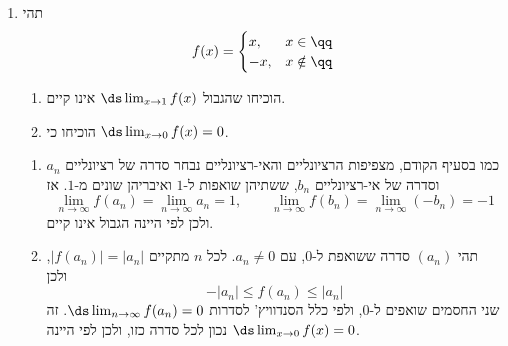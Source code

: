 \begin{enumerate}
\item תהי
\[f(x)=\begin{cases}x, & x\in\qq\\ -x, & x\notin\qq\end{cases}\]
\begin{enumerate}
\item הוכיחו שהגבול $\ds\lim_{x\to1}f(x)$ אינו קיים.
\item הוכיחו כי $\ds\lim_{x\to0}f(x)=0$.
\end{enumerate}
\ifsol
{}
\begin{solbox}
\begin{enumerate}
\item כמו בסעיף הקודם, מצפיפות הרציונליים והאי-רציונליים נבחר סדרה של רציונליים $a_n$ וסדרה של אי-רציונליים $b_n$, ששתיהן שואפות ל-$1$ ואיבריהן שונים מ-$1$. אז
\[\lim_{n\to\infty}f(a_n)=\lim_{n\to\infty}a_n=1,\qquad \lim_{n\to\infty}f(b_n)=\lim_{n\to\infty}(-b_n)=-1\]
ולכן לפי היינה הגבול אינו קיים.
\item תהי $(a_n)$ סדרה ששואפת ל-$0$, עם $a_n\ne0$. לכל $n$ מתקיים $|f(a_n)|=|a_n|$, ולכן
\[-|a_n|\le f(a_n)\le|a_n|\]
שני החסמים שואפים ל-$0$, ולפי כלל הסנדוויץ' לסדרות $\ds\lim_{n\to\infty}f(a_n)=0$. זה נכון לכל סדרה כזו, ולכן לפי היינה $\ds\lim_{x\to0}f(x)=0$.
\end{enumerate}
\end{solbox}
\fi

\eMs
\end{enumerate}
